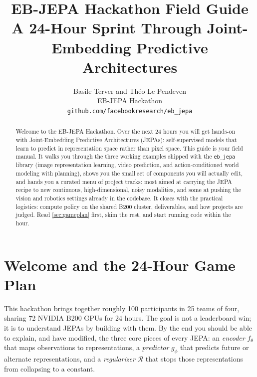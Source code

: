 \documentclass{article}
\title{EB-JEPA Hackathon Field Guide\\[0.3em]
\large A 24-Hour Sprint Through Joint-Embedding Predictive Architectures}
\author{Basile Terver and Théo Le Pendeven\\
EB-JEPA Hackathon\\
\texttt{github.com/facebookresearch/eb\_jepa}
}
\begin{document}
\maketitle
{}

\begin{abstract}
Welcome to the EB-JEPA Hackathon. Over the next 24 hours you will get hands-on
with Joint-Embedding Predictive Architectures (JEPAs): self-supervised models
that learn to predict in representation space rather than pixel space. This guide
is your field manual. It walks you through the three working examples shipped
with the \texttt{eb\_jepa} library (image representation learning, video
prediction, and action-conditioned world modeling with planning), shows you the
small set of components you will actually edit, and hands you a curated menu of
project tracks: most aimed at carrying the JEPA recipe to new continuous,
high-dimensional, noisy modalities, and some at pushing the vision and robotics
settings already in the codebase. It closes with the practical logistics:
compute policy on the shared B200 cluster, deliverables, and how projects are
judged. Read \cref{sec:gameplan} first, skim the rest, and start running code
within the hour.
\end{abstract}

\section{Welcome and the 24-Hour Game Plan}
\label{sec:gameplan}

This hackathon brings together roughly 100 participants in 25 teams of four,
sharing 72 NVIDIA B200 GPUs for 24 hours. The goal is not a leaderboard win; it
is to understand JEPAs by building with them. By the end you should be able to
explain, and have modified, the three core pieces of every JEPA: an
\emph{encoder} $f_\theta$ that maps observations to representations, a
\emph{predictor} $g_\phi$ that predicts future or alternate representations, and
a \emph{regularizer} $\mathcal{R}$ that stops those representations from
collapsing to a constant.
\end{document}
